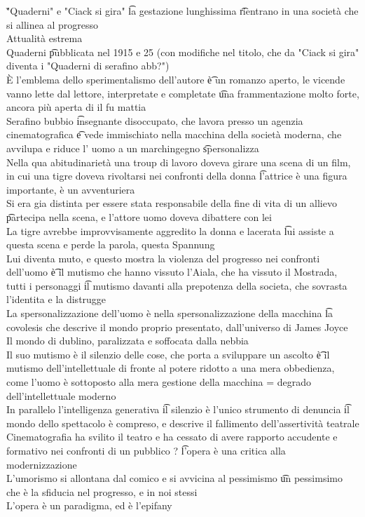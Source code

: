 \documentclass[12pt]{article}
\begin{document}
\v

"Quaderni" e "Ciack si gira" \t la gestazione lunghissima \t rientrano in una società che si allinea al progresso \\
Attualità estrema \\
Quaderni \t pubblicata nel 1915 e 25 (con modifiche nel titolo, che da "Ciack si gira" diventa i "Quaderni di serafino abb?") \\
È l'emblema dello sperimentalismo dell'autore \t è un romanzo aperto, le vicende vanno lette dal lettore, interpretate e completate \t una frammentazione molto forte, ancora più aperta di il fu mattia \\
Serafino bubbio \t insegnante disoccupato, che lavora presso un agenzia cinematografica \t e vede immischiato nella macchina della società moderna, che avvilupa e riduce l' uomo a un marchingegno \t spersonalizza \\
Nella qua abitudinarietà una troup di lavoro doveva girare una scena di un film, in cui una tigre doveva rivoltarsi nei confronti della donna \t l'attrice è una figura importante, è un avventuriera \\
Si era gia distinta per essere stata responsabile della fine di vita di un allievo \t partecipa nella scena, e l'attore uomo doveva dibattere con lei \\
La tigre avrebbe improvvisamente aggredito la donna e lacerata \t lui assiste a questa scena e perde la parola, questa Spannung \\
Lui diventa muto, e questo mostra la violenza del progresso nei confronti dell'uomo \t è il mutismo che hanno vissuto l'Aiala, che ha vissuto il Mostrada, tutti i personaggi \t il mutismo davanti alla prepotenza della societa, che sovrasta l'identita e la distrugge \\
La spersonalizzazione dell'uomo è nella spersonalizzazione della macchina \t la covolesis che descrive il mondo proprio presentato, dall'universo di James Joyce \\
Il mondo di dublino, paralizzata e soffocata dalla nebbia \\
Il suo mutismo è il silenzio delle cose, che porta a sviluppare un ascolto \t è il mutismo dell'intellettuale di fronte al potere ridotto a una mera obbedienza, come l'uomo è sottoposto alla mera gestione della macchina = degrado dell'intellettuale moderno \\
In parallelo l'intelligenza generativa \t il silenzio è l'unico strumento di denuncia \t il mondo dello spettacolo è compreso, e descrive il fallimento dell'assertività teatrale \\
Cinematografia ha svilito il teatro e ha cessato di avere rapporto accudente e formativo nei confronti di un pubblico ? \t l'opera è una critica alla modernizzazione \\
L'umorismo si allontana dal comico e si avvicina al pessimismo \t un pessimsimo che è la sfiducia nel progresso, e in noi stessi \\
L'opera è un paradigma, ed è l'epifany
\end{document}
